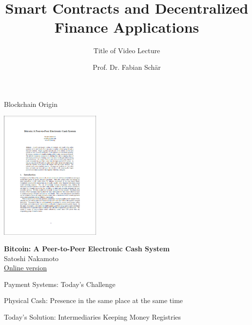 \documentclass[]{beamer}
\title{Smart Contracts and Decentralized Finance Applications}
\subtitle{Title of Video Lecture}
\author{Prof. Dr. Fabian Schär}
\institute{University of Basel}
\begin{document}
\thispagestyle{empty}
\begin{frame}[noframenumbering]
	\titlepage
\end{frame}


\begin{frame}{Blockchain Origin}

\centering
\includegraphics[width = 5cm, frame]{../assets/images/nakamoto_cover}
		
\textbf{Bitcoin: A Peer-to-Peer Electronic Cash System} \\ 
Satoshi Nakamoto \\
\link \href{https://bitcoin.org/bitcoin.pdf}{Online version}

\end{frame}

\begin{frame}{Payment Systems: Today's Challenge}

Physical Cash: Presence in the same place at the same time
\begin{figure}[h]
	\center
		
\end{figure}

\vspace{1.5 em}

	
\end{frame}


\begin{frame}{Today's Solution: Intermediaries Keeping Money Registries}

\begin{figure}[h]
	\center
		
\end{figure}

	
\end{frame}
\end{document}
